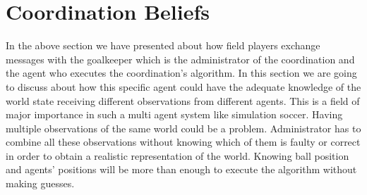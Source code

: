 \section{Coordination Beliefs}
In the above section we have presented about how field players exchange messages with the goalkeeper which is the administrator of the coordination and the agent who executes the coordination's algorithm. In this section we are going to discuss about how this specific agent could have the adequate knowledge of the world state receiving different observations from different agents. This is a field of major importance in such a multi agent system like simulation soccer. Having multiple observations of the same world could be a problem. Administrator has to combine all these observations without knowing which of them is faulty or correct in order to obtain a realistic representation of the world. Knowing ball position and agents' positions will be more than enough to execute the algorithm without making guesses.


